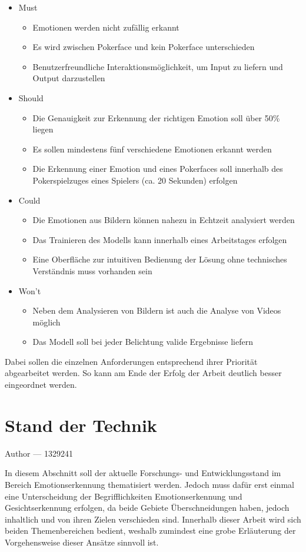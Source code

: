 \documentclass[12pt, a4paper]{report}
\makeatletter
\newcommand{\chapterauthor}[1]{%
  {\parindent0pt\vspace*{-25pt}%
  \large{Author --- }
  \linespread{1.1}\large\scshape#1%
  \par\nobreak\vspace*{35pt} }
  \@afterheading%
}
\makeatother
\begin{document}
\begin{itemize}
\item Must
\begin{itemize}
\item Emotionen werden nicht zufällig erkannt
\item Es wird zwischen Pokerface und kein Pokerface unterschieden
\item Benutzerfreundliche Interaktionsmöglichkeit, um Input zu liefern und Output darzustellen
\end{itemize}
\item Should
\begin{itemize}
\item Die Genauigkeit zur Erkennung der richtigen Emotion soll über 50\% liegen
\item Es sollen mindestens fünf verschiedene Emotionen erkannt werden
\item Die Erkennung einer Emotion und eines Pokerfaces soll innerhalb des Pokerspielzuges eines Spielers (ca. 20 Sekunden) erfolgen
\end{itemize}
\item Could
\begin{itemize}
\item Die Emotionen aus Bildern können nahezu in Echtzeit analysiert werden
\item Das Trainieren des Modells kann innerhalb eines Arbeitstages erfolgen
\item Eine Oberfläche zur intuitiven Bedienung der Lösung ohne technisches Verständnis muss vorhanden sein
\end{itemize}
\item Won't
\begin{itemize}
\item Neben dem Analysieren von Bildern ist auch die Analyse von Videos möglich
\item Das Modell soll bei jeder Belichtung valide Ergebnisse liefern
\end{itemize}
\end{itemize}
Dabei sollen die einzelnen Anforderungen entsprechend ihrer Priorität abgearbeitet werden. So kann am Ende der Erfolg der Arbeit deutlich besser eingeordnet werden.

\let\cleardoublepage\relax

\chapter{Stand der Technik}
\chapterauthor{1329241}
In diesem Abschnitt soll der aktuelle Forschungs- und Entwicklungsstand im Bereich Emotionserkennung thematisiert werden. Jedoch muss dafür erst einmal eine Unterscheidung der Begrifflichkeiten Emotionserkennung und Gesichtserkennung erfolgen, da beide Gebiete Überschneidungen haben, jedoch inhaltlich und von ihren Zielen verschieden sind. Innerhalb dieser Arbeit wird sich beiden Themenbereichen bedient, weshalb zumindest eine grobe Erläuterung der Vorgehensweise dieser Ansätze sinnvoll ist.
\end{document}

